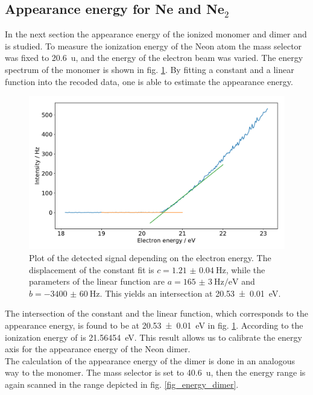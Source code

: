 \documentclass[a4paper,10pt]{article}
\begin{document}
\subsection{Appearance energy for Ne and Ne$_2$}
In the next section the appearance energy of the ionized monomer and dimer  and  is studied. To measure the ionization energy of the Neon atom the mass selector was fixed to \SI{20.6}{\atomicmassunit}, and the energy of the electron beam was varied. The energy spectrum of the monomer is shown in fig. \ref{fig_energy_monomer}. By fitting a constant and a linear function into the recoded data, one is able to estimate the appearance energy.
\begin{figure}[H]
	\centering
	\includegraphics[width = 0.8 \textwidth]{energy_ne.pdf}
	\caption{Plot of the detected signal depending on the electron energy. The displacement of the constant fit is $c=\SI{1.21(4)}{\hertz}$, while the parameters of the linear function are $a = \SI{165(3)}{\hertz \per \electronvolt}$ and $b = \SI{-3400(60)}{\hertz}$. This yields an intersection at \SI{20.53(1)}{\electronvolt}. }
	\label{fig_energy_monomer}
\end{figure} \newpage
The intersection of the constant and the linear function, which corresponds to the appearance energy, is found to be at \SI{20.53(1)}{\electronvolt} in fig. \ref{fig_energy_monomer}. According to \cite{neon_nist} the ionization energy of  is \SI{21.56454}{\electronvolt}. This result allows us to calibrate the energy axis for the appearance energy of the Neon dimer. \\
The calculation of the appearance energy of the dimer is done in an analogous way to the monomer. The mass selector is set to \SI{40.6}{\atomicmassunit}, then the energy range is again scanned in the range depicted in fig. \ref{fig_energy_dimer}.
\end{document}
